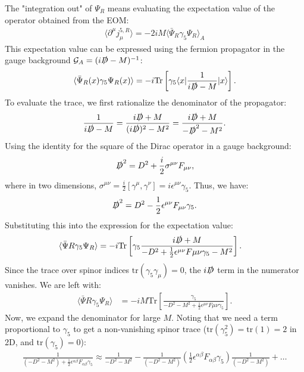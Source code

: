 The "integration out" of $\Psi_R$ means evaluating the expectation value of the operator obtained from the EOM:
\begin{align}
\langle \partial^\mu j_\mu^{5,R} \rangle = -2iM \langle \bar{\Psi}_R \gamma_5 \Psi_R \rangle_A
\end{align}
This expectation value can be expressed using the fermion propagator in the gauge background $\mathcal{G}_A = (i\slashed{D}-M)^{-1}$:
\begin{align}
\langle \bar{\Psi}_R(x) \gamma_5 \Psi_R(x) \rangle = -i \text{Tr} \left[ \gamma_5 \langle x | \frac{1}{i\slashed{D} - M} | x \rangle \right].
\end{align}
To evaluate the trace, we first rationalize the denominator of the propagator:
\begin{align}
    \frac{1}{i\slashed{D} - M} = \frac{i\slashed{D} + M}{(i\slashed{D})^2 - M^2} = \frac{i\slashed{D} + M}{-\slashed{D}^2 - M^2}.
\end{align}
Using the identity for the square of the Dirac operator in a gauge background:
\begin{align}
    \slashed{D}^2 = D^2 + \frac{i}{2} \sigma^{\mu\nu} F_{\mu\nu},
\end{align}
where in two dimensions, $\sigma^{\mu\nu} = \frac{i}{2}[\gamma^\mu, \gamma^\nu] = i \epsilon^{\mu\nu} \gamma_5$. Thus, we have:
\begin{align}
    \slashed{D}^2 = D^2 - \frac{1}{2} \epsilon^{\mu\nu} F_{\mu\nu} \gamma_5.
\end{align}
Substituting this into the expression for the expectation value:
\begin{align}
    \langle \bar{\Psi}R \gamma_5 \Psi_R \rangle &= -i \text{Tr} \left[ \gamma_5 \frac{i\slashed{D} + M}{-D^2 + \frac{1}{2} \epsilon^{\mu\nu} F{\mu\nu} \gamma_5 - M^2} \right].
\end{align}
Since the trace over spinor indices $\text{tr}(\gamma_5 \gamma_\mu) = 0$, the $i\slashed{D}$ term in the numerator vanishes. We are left with:
\begin{align}
    \langle \bar{\Psi}R \gamma_5 \Psi_R \rangle &= -i M \text{Tr} \left[ \frac{\gamma_5}{-D^2 - M^2 + \frac{1}{2} \epsilon^{\mu\nu} F{\mu\nu} \gamma_5} \right].
\end{align}
Now, we expand the denominator for large $M$. Noting that we need a term proportional to $\gamma_5$ to get a non-vanishing spinor trace ($\text{tr}(\gamma_5^2) = \text{tr}(1) = 2$ in 2D, and $\text{tr}(\gamma_5) = 0$):
\begin{align}
    \frac{1}{(-D^2 - M^2) + \frac{1}{2} \epsilon^{\alpha\beta} F_{\alpha\beta} \gamma_5} \approx \frac{1}{-D^2 - M^2} - \frac{1}{(-D^2 - M^2)} \left( \frac{1}{2} \epsilon^{\alpha\beta} F_{\alpha\beta} \gamma_5 \right) \frac{1}{(-D^2 - M^2)} + \dots
\end{align}

